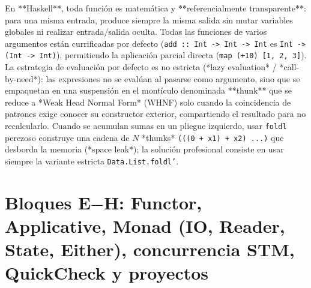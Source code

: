 \documentclass{book}
\begin{document}
En **Haskell**, toda función es matemática y **referencialmente transparente**: para una misma entrada, produce siempre la misma salida sin mutar variables globales ni realizar entrada/salida oculta. Todas las funciones de varios argumentos están currificadas por defecto (\texttt{add :: Int -> Int -> Int} es \texttt{Int -> (Int -> Int)}), permitiendo la aplicación parcial directa (\texttt{map (+10) [1, 2, 3]}). La estrategia de evaluación por defecto es no estricta (*lazy evaluation* / *call-by-need*): las expresiones no se evalúan al pasarse como argumento, sino que se empaquetan en una suspensión en el montículo denominada **thunk** que se reduce a *Weak Head Normal Form* (WHNF) solo cuando la coincidencia de patrones exige conocer su constructor exterior, compartiendo el resultado para no recalcularlo. Cuando se acumulan sumas en un pliegue izquierdo, usar \texttt{foldl} perezoso construye una cadena de \(N\) *thunks* \texttt{(((0 + x1) + x2) ...)} que desborda la memoria (*space leak*); la solución profesional consiste en usar siempre la variante estricta \texttt{Data.List.foldl'}.

\section{Bloques E\(-\)H: Functor, Applicative, Monad (IO, Reader, State, Either), concurrencia STM, QuickCheck y proyectos}
\end{document}
